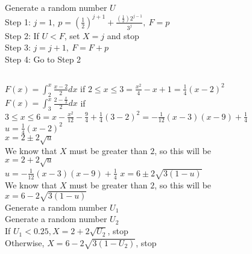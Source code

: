 \documentclass{article}
\begin{document}
\setcounter{subsection}{16}
\subsection{}
Generate a random number $U$ \\
Step 1: $j=1,~p=\left(\frac{1}{2}\right)^{j+1} + \frac{\left(\frac{1}{2}\right)2^{j-1}}{3^j},~F=p$ \\
Step 2: If $U < F$, set $X=j$ and stop \\
Step 3: $j=j+1,~F=F+p$ \\
Step 4: Go to Step 2 \\
\newpage

\setcounter{section}{5}
\setcounter{subsection}{1}
\subsection{}
$F(x) = \int_2^x \frac{x-2}{2} dx$ if $2 \leq x \leq 3 = \frac{x^2}{4} - x + 1 = \frac{1}{4}(x-2)^2$ \\ 
$F(x) = \int_3^x \frac{2-\frac{x}{3}}{2} dx$ if $3 \leq x \leq 6 = x - \frac{x^2}{12} - \frac{9}{4} + \frac{1}{4}(3-2)^2 = -\frac{1}{12}(x-3)(x-9) +  \frac{1}{4}$ \\ 
$u = \frac{1}{4}(x-2)^2$ \\
$x = 2 \pm 2\sqrt{u}$ \\
We know that $X$ must be greater than $2$, so this will be \\
$x = 2 + 2\sqrt{u}$ \\
$u = -\frac{1}{12}(x-3)(x-9) +  \frac{1}{4}$
$x = 6 \pm 2\sqrt{3(1-u)}$ \\
We know that $X$ must be greater than $2$, so this will be \\
$x = 6 - 2\sqrt{3(1-u)}$ \\
Generate a random number $U_1$ \\
Generate a random number $U_2$ \\
If $U_1 < 0.25, X = 2 + 2\sqrt{U_2}$, stop \\
Otherwise, $X = 6 - 2\sqrt{3(1-U_2)}$, stop \\

\newpage
\setcounter{subsection}{7}
\end{document}
